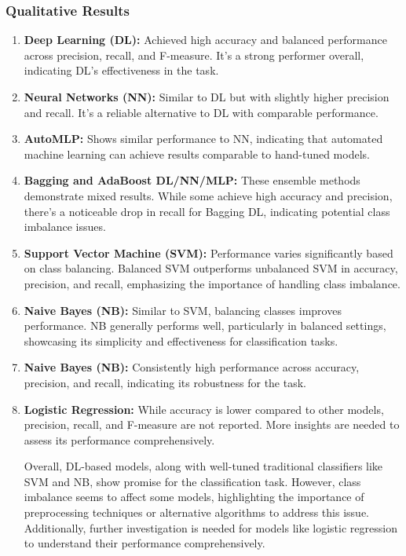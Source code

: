 \subsubsection{Qualitative Results}
\begin{enumerate}

\item \textbf{Deep Learning (DL):} Achieved high accuracy and balanced performance across precision, recall, and F-measure. It's a strong performer overall, indicating DL's effectiveness in the task.

\item \textbf{Neural Networks (NN):} Similar to DL but with slightly higher precision and recall. It's a reliable alternative to DL with comparable performance.

\item \textbf{AutoMLP:} Shows similar performance to NN, indicating that automated machine learning can achieve results comparable to hand-tuned models.

\item \textbf{Bagging and AdaBoost DL/NN/MLP:} These ensemble methods demonstrate mixed results. While some achieve high accuracy and precision, there's a noticeable drop in recall for Bagging DL, indicating potential class imbalance issues.

\item \textbf{Support Vector Machine (SVM):} Performance varies significantly based on class balancing. Balanced SVM outperforms unbalanced SVM in accuracy, precision, and recall, emphasizing the importance of handling class imbalance.

\item \textbf{Naive Bayes (NB):} Similar to SVM, balancing classes improves performance. NB generally performs well, particularly in balanced settings, showcasing its simplicity and effectiveness for classification tasks.

\item \textbf{Naive Bayes (NB):} Consistently high performance across accuracy, precision, and recall, indicating its robustness for the task.

\item \textbf{Logistic Regression:} While accuracy is lower compared to other models, precision, recall, and F-measure are not reported. More insights are needed to assess its performance comprehensively.

Overall, DL-based models, along with well-tuned traditional classifiers like SVM and NB, show promise for the classification task. However, class imbalance seems to affect some models, highlighting the importance of preprocessing techniques or alternative algorithms to address this issue. Additionally, further investigation is needed for models like logistic regression to understand their performance comprehensively.
\end{enumerate}